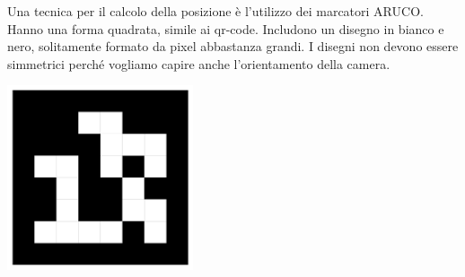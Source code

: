 \vspace{10px}
\begin{minipage}{.5\textwidth}
   Una tecnica per il calcolo della posizione è l'utilizzo dei marcatori ARUCO.
   Hanno una forma quadrata, simile ai qr-code. Includono un disegno in bianco e nero, solitamente formato da pixel abbastanza grandi. I disegni non devono essere simmetrici perché vogliamo capire anche l'orientamento della camera. 
\end{minipage} 
\hfill
\begin{minipage}{.45\textwidth}
    \begin{center}
        \includegraphics[width=.45\textwidth]{images/MobiDEV/3. augmented reality/aruco.PNG}
    \end{center}
\end{minipage}

